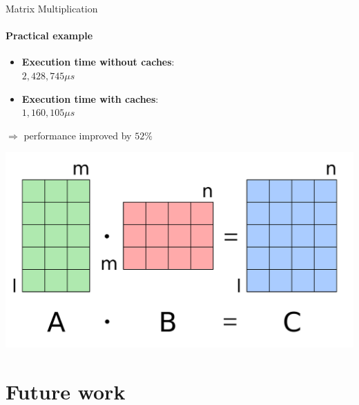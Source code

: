 \documentclass[handout]{beamer}
\begin{document}
\begin{frame}{Matrix Multiplication}
	\framesubtitle{Practical example}
	\begin{minipage}{.75\textwidth}
		\begin{itemize}
			\item \textbf{Execution time without caches}:\\ $2,428,745 \mu s$
			\item \textbf{Execution time with caches}:\\ $1,160,105 \mu s$
		\end{itemize}
		\begin{center}
			$\Rightarrow$ performance improved by $52\%$
		\end{center}
	\end{minipage}
	\begin{minipage}{.23\textwidth}
		\begin{center}
			\includegraphics[width=.9\textwidth]{matmul.png}
		\end{center}
	\end{minipage}
\end{frame}

\section{Future work}
\end{document}
